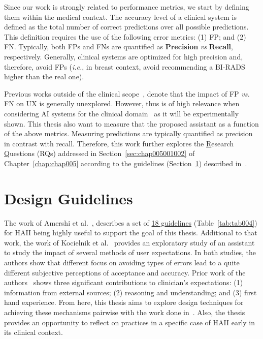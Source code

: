 \vspace{2.00mm}


Since our work is strongly related to performance metrics, we start by defining them within the medical context.
The accuracy level of a clinical system is defined as the total number of correct predictions over all possible predictions.
This definition requires  the use of the following error metrics:
(1) \ac{FP}; and
(2) \ac{FN}.
Typically, both \acp{FP} and \acp{FN} are quantified as {\bf Precision} {\it vs} {\bf Recall}, respectively.
Generally, clinical systems are optimized for high precision and, therefore, avoid \acp{FP} ({\it i.e.}, in breast context, avoid recommending a \ac{BI-RADS} higher than the real one).

Previous works outside of the clinical scope~\cite{Kocielnik:2019:YAI:3290605.3300641, Dove:2017:UDI:3025453.3025739}, denote that the impact of \ac{FP} {\it vs.} \ac{FN} on \ac{UX} is generally unexplored.
However, thus is of high relevance when considering \ac{AI} systems for the clinical domain~\cite{CALISTO2022102285} as it will be experimentally shown.
This thesis also want to measure that the proposed assistant as a function of the above metrics.
Measuring predictions are typically quantified as precision in contrast with recall.
Therefore, this work further explores the \underline{R}esearch \underline{Q}uestions (\acsp{RQ}) addressed in Section~\ref{sec:chap005001002} of Chapter~\ref{chap:chap005} according to the guidelines (Section~\ref{sec:app003002}) described in~\cite{10.1145/3290605.3300233, Kocielnik:2019:YAI:3290605.3300641}.

\section{Design Guidelines}
\label{sec:app003002}

The work of Amershi et al.~\cite{10.1145/3290605.3300233}, describes a set of \underline{18 guidelines} (Table~\ref{tab:tab004}) for \ac{HAII} being highly useful to support the goal of this thesis.
Additional to that work, the work of Kocielnik et al.~\cite{Kocielnik:2019:YAI:3290605.3300641} provides an exploratory study of an assistant to study the impact of several methods of user expectations.
In both studies, the authors show that different focus on avoiding types of errors lead to a quite different subjective perceptions of acceptance and accuracy.
Prior work of the authors~\cite{Kocielnik:2019:YAI:3290605.3300641} shows three significant contributions to clinician's expectations:
(1) information from external sources;
(2) reasoning and understanding; and
(3) first hand experience.
From here, this thesis aims to explore design techniques for achieving these mechanisms pairwise with the work done in~\cite{10.1145/3290605.3300233}.
Also, the thesis provides an opportunity to reflect on practices in a specific case of \ac{HAII} early in its clinical context.

